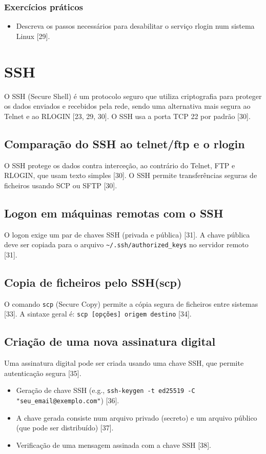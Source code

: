 \documentclass[12pt, a4paper]{article}
\begin{document}
	\subsubsection{Exercícios práticos} %
	\begin{itemize}
		\item Descreva os passos necessários para desabilitar o serviço rlogin num sistema Linux [29].
	\end{itemize}
	
	\section{SSH} %
	O SSH (Secure Shell) é um protocolo seguro que utiliza criptografia para proteger os dados enviados e recebidos pela rede, sendo uma alternativa mais segura ao Telnet e ao RLOGIN [23, 29, 30]. O SSH usa a porta TCP 22 por padrão [30].
	
	\subsection{Comparação do SSH ao telnet/ftp e o rlogin} %
	O SSH protege os dados contra interceção, ao contrário do Telnet, FTP e RLOGIN, que usam texto simples [30]. O SSH permite transferências seguras de ficheiros usando SCP ou SFTP [30].
	
	\subsection{Logon em máquinas remotas com o SSH} %
	O logon exige um par de chaves SSH (privada e pública) [31]. A chave pública deve ser copiada para o arquivo \texttt{\textasciitilde/.ssh/authorized\_keys} no servidor remoto [31].
	
	\subsection{Copia de ficheiros pelo SSH(scp)} %
	O comando \texttt{scp} (Secure Copy) permite a cópia segura de ficheiros entre sistemas [33]. A sintaxe geral é: \texttt{scp [opções] origem destino} [34].
	
	\subsection{Criação de uma nova assinatura digital} %
	Uma assinatura digital pode ser criada usando uma chave SSH, que permite autenticação segura [35].
	\begin{itemize}
		\item Geração de chave SSH (e.g., \texttt{ssh-keygen -t ed25519 -C "seu\_email@exemplo.com"}) [36].
		\item A chave gerada consiste num arquivo privado (secreto) e um arquivo público (que pode ser distribuído) [37].
		\item Verificação de uma mensagem assinada com a chave SSH [38].
	\end{itemize}
\end{document}
